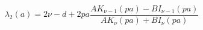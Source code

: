 \begin{equation}
\lambda_2(a)=2 \nu-d+ 2pa \frac {A K_{\nu-1}(p a)-B I_{\nu-1}(p
a)} {A K_{\nu}(p a)+B I_{\nu}(p a)} \label{fpapp}
\end{equation}

